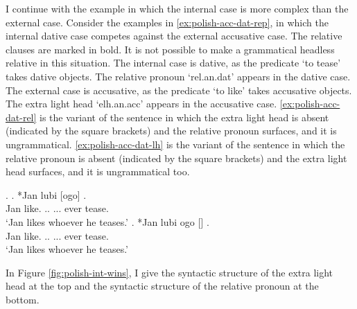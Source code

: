 I continue with the example in which the internal case is more complex than the external case.
Consider the examples in \ref{ex:polish-acc-dat-rep}, in which the internal dative case competes against the external accusative case. The relative clauses are marked in bold. It is not possible to make a grammatical headless relative in this situation.
The internal case is dative, as the predicate  `to tease' takes dative objects. The relative pronoun  `\ac{rel}.\ac{an}.\ac{dat}' appears in the dative case.
The external case is accusative, as the predicate  `to like' takes accusative objects. The extra light head  `\ac{elh}.\ac{an}.\ac{acc}' appears in the accusative case.
\ref{ex:polish-acc-dat-rel} is the variant of the sentence in which the extra light head is absent (indicated by the square brackets) and the relative pronoun surfaces, and it is ungrammatical.
\ref{ex:polish-acc-dat-lh} is the variant of the sentence in which the relative pronoun is absent (indicated by the square brackets) and the extra light head surfaces, and it is ungrammatical too.

\ex.\label{ex:polish-acc-dat-rep}
\ag. *Jan lubi [ogo]   .\\
Jan like.\scsub{[acc]} .. ... ever tease.\scsub{[dat]}\\
`Jan likes whoever he teases.' \label{ex:polish-acc-dat-rel}
\bg. *Jan lubi ogo []  .\\
Jan like.\scsub{[acc]} .. ... ever tease.\scsub{[dat]}\\
`Jan likes whoever he teases.' \label{ex:polish-acc-dat-lh}

In Figure \ref{fig:polish-int-wins}, I give the syntactic structure of the extra light head at the top and the syntactic structure of the relative pronoun at the bottom.


